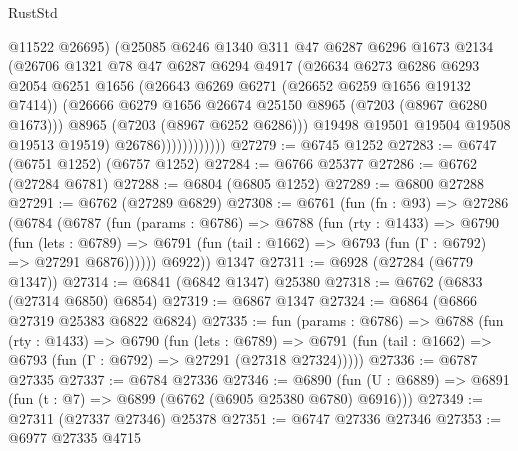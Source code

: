 \begin{lexlean}{RustStd}
\begin{coremodule}
                            @11522
                            @26695)
                          (@25085
                            @6246
                            @1340
                            @311
                            @47
                            @6287
                            @6296
                            @1673
                            @2134
                            (@26706
                              @1321
                              @78
                              @47
                              @6287
                              @6294
                              @4917
                              (@26634
                                @6273
                                @6286
                                @6293
                                @2054
                                @6251
                                @1656
                                (@26643 @6269 @6271 (@26652 @6259 @1656 @19132 @7414))
                                (@26666 @6279 @1656 @26674 @25150 @8965 (@7203 (@8967 @6280 @1673)))
                                @8965
                                (@7203 (@8967 @6252 @6286)))
                              @19498
                              @19501
                              @19504
                              @19508
                              @19513
                              @19519)
                            @26786))))))))))))
@27279 := @6745 @1252
@27283 := @6747 (@6751 @1252) (@6757 @1252)
@27284 := @6766 @25377
@27286 := @6762 (@27284 @6781)
@27288 := @6804 (@6805 @1252)
@27289 := @6800 @27288
@27291 := @6762 (@27289 @6829)
@27308 := @6761
    (fun (fn : @93) =>
    @27286
      (@6784
        (@6787
          (fun (params : @6786) =>
          @6788
            (fun (rty : @1433) =>
            @6790
              (fun (lets : @6789) =>
              @6791 (fun (tail : @1662) => @6793 (fun (Γ : @6792) => @27291 @6876))))))
        @6922))
    @1347
@27311 := @6928 (@27284 (@6779 @1347))
@27314 := @6841 (@6842 @1347) @25380
@27318 := @6762 (@6833 (@27314 @6850) @6854)
@27319 := @6867 @1347
@27324 := @6864 (@6866 @27319 @25383 @6822 @6824)
@27335 := fun (params : @6786) =>
  @6788
    (fun (rty : @1433) =>
    @6790
      (fun (lets : @6789) =>
      @6791 (fun (tail : @1662) => @6793 (fun (Γ : @6792) => @27291 (@27318 @27324)))))
@27336 := @6787 @27335
@27337 := @6784 @27336
@27346 := @6890
    (fun (U : @6889) => @6891 (fun (t : @7) => @6899 (@6762 (@6905 @25380 @6780) @6916)))
@27349 := @27311 (@27337 @27346) @25378
@27351 := @6747 @27336 @27346
@27353 := @6977 @27335 @4715

\end{coremodule}
\end{lexlean}
